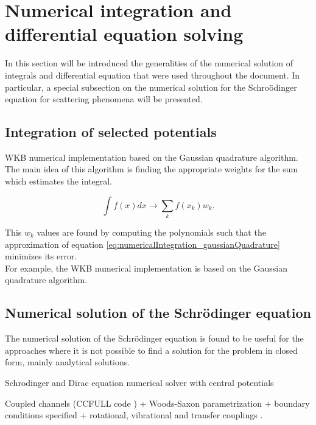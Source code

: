 \documentclass[openany]{book}
\begin{document}
\chapter{Numerical integration and differential equation solving} \label{ap:numericalSolving}


In this section will be introduced the generalities of the numerical solution of integrals and differential equation that were used throughout the document. In particular, a special subsection on the numerical solution for the Schroödinger equation for scattering phenomena will be presented. 

\section{Integration of selected potentials} \label{sec:integrationPotentials}

WKB numerical implementation based on the Gaussian quadrature algorithm. \\

The main idea of this algorithm is finding the appropriate weights for the sum which estimates the integral. 

\begin{equation}\label{eq:numericalIntegration_gaussianQuadrature}
	\int f(x) dx \rightarrow \sum_{k}{ f(x_k) w_k}.
\end{equation}

This $w_k$ values are found by computing the polynomials such that the approximation of equation \ref{eq:numericalIntegration_gaussianQuadrature} minimizes its error. \\

For example, the WKB numerical implementation is based on the Gaussian quadrature algorithm. \\

\section{Numerical solution of the Schrödinger equation} \label{sec:schrodingerSolution}

The numerical solution of the Schrödinger equation is found to be useful for the approaches where it is not possible to find a solution for the problem in closed form, mainly analytical solutions. 

Schrodinger and Dirac equation numerical solver with central potentials \cite{salvat_fernandez-varea_2019}

Coupled channels (CCFULL code ) + Woods-Saxon parametrization + boundary conditions specified + rotational, vibrational and transfer couplings \cite{hagino_rowley_kruppa_1999}.
\end{document}
